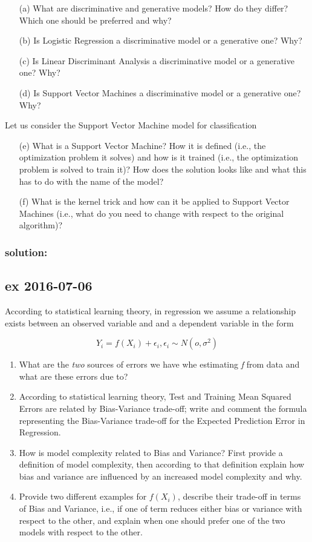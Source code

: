 \documentclass[a4paper,12pt,titlepage]{article} %
\begin{document}
\begin{itemize}
\item[(a)] What are discriminative and generative models? How do they differ? Which one should be preferred and why?
\item[(b)] Is Logistic Regression a discriminative model or a generative one? Why?
\item[(c)] Is Linear Discriminant Analysis a discriminative model or a generative one? Why?
\item[(d)] Is Support Vector Machines a discriminative model or a generative one? Why?
\end{itemize}

Let us consider the Support Vector Machine model for classification

\begin{itemize}
\item[(e)] What is a Support Vector Machine? How it is defined (i.e., the optimization problem it solves) and how is it trained (i.e., the optimization problem is solved to train it)? How does the solution looks like and what this has to do with the name of the model?
\item[(f)] What is the kernel trick and how can it be applied to Support Vector Machines (i.e., what do you need to change with respect to the original algorithm)?
\end{itemize}

\subsubsection{solution:}


\newpage
\subsection{ex 2016-07-06}
According to statistical learning theory, in regression we assume a relationship exists between an observed variable and and a dependent variable in the form 

$$ Y_{i} = f(X_{i}) + \epsilon_{i}, \epsilon_{i} \sim N(o, \sigma^{2})$$

\begin{enumerate}
\item What are the \textit{two} sources of errors we have whe estimating \textit{f} from data and what are these errors due to?
\item According to statistical learning theory, Test and Training Mean Squared Errors are related by Bias-Variance trade-off; write and comment the formula representing the Bias-Variance trade-off for the Expected Prediction Error in Regression.
\item How is model complexity related to Bias and Variance? First provide a definition of model complexity, then according to that definition explain how bias and variance are influenced by an increased model complexity and why.
\item Provide two different examples for $ f(X_{i}) $, describe their trade-off in terms of Bias and Variance, i.e., if one of term reduces either bias or variance with respect to the other, and explain when one should prefer one of the two models with respect to the other.
\end{enumerate}
\end{document}
